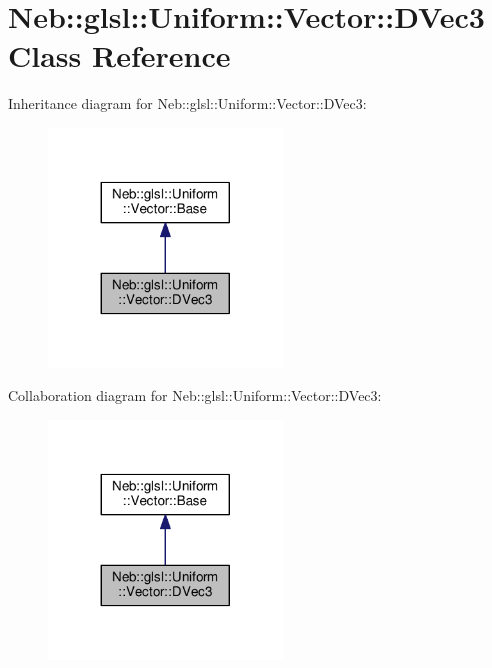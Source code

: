 \hypertarget{classNeb_1_1glsl_1_1Uniform_1_1Vector_1_1DVec3}{\section{Neb\-:\-:glsl\-:\-:Uniform\-:\-:Vector\-:\-:D\-Vec3 Class Reference}
\label{classNeb_1_1glsl_1_1Uniform_1_1Vector_1_1DVec3}
}


Inheritance diagram for Neb\-:\-:glsl\-:\-:Uniform\-:\-:Vector\-:\-:D\-Vec3\-:
\nopagebreak
\begin{figure}[H]
\begin{center}
\leavevmode
\includegraphics[width=176pt]{classNeb_1_1glsl_1_1Uniform_1_1Vector_1_1DVec3__inherit__graph}
\end{center}
\end{figure}


Collaboration diagram for Neb\-:\-:glsl\-:\-:Uniform\-:\-:Vector\-:\-:D\-Vec3\-:
\nopagebreak
\begin{figure}[H]
\begin{center}
\leavevmode
\includegraphics[width=176pt]{classNeb_1_1glsl_1_1Uniform_1_1Vector_1_1DVec3__coll__graph}
\end{center}
\end{figure}

